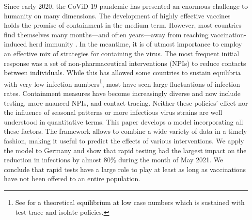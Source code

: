 



Since early 2020, the CoViD-19 pandemic has presented an enormous challenge to humanity
on many dimensions. The development of highly effective vaccines holds the promise of
containment in the medium term. However, most countries find themselves many months---and
often years---away from reaching vaccination-induced herd immunity
\citep{Swaminathan2021}. In the meantime, it is of utmost importance to employ an effective mix
of strategies for containing the virus. The most frequent initial response was a set of
non-pharmaceutical interventions (NPIs) to reduce contacts between individuals. While
this has allowed some countries to sustain equilibria with very low infection
numbers\footnote{See \citet{Contreras2021} for a theoretical equilibrium at low case
numbers which is sustained with test-trace-and-isolate policies.}, most have seen large
fluctuations of infection rates. Containment measures have become increasingly diverse
and now include testing, more nuanced NPIs, and contact tracing. Neither these policies'
effect nor the influence of seasonal patterns or more infectious virus strains are well
understood in quantitative terms. This paper develops a model incorporating all these
factors. The framework allows to combine a wide variety of data in a timely fashion,
making it useful to predict the effects of various interventions. We apply the model to
Germany and show that rapid testing had the largest impact on the reduction in infections
by almost 80\% during the month of May 2021. We conclude that rapid tests have a large
role to play at least as long as vaccinations have not been offered to an entire
population.

